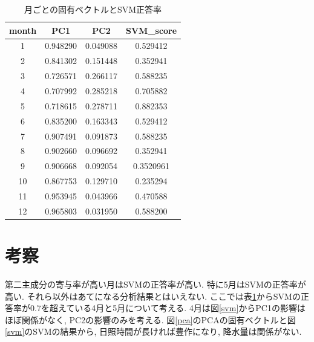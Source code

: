 \documentclass{jarticle}
\begin{document}
\begin{table}[H]
\caption{月ごとの固有ベクトルとSVM正答率}
\begin{tabular}{|c|c|c|c|} \hline
month&PC1&PC2 &SVM\_score\\ \hline
 1&0.948290&0.049088&0.529412\\ \hline
 2&0.841302&0.151448&0.352941\\ \hline
 3&0.726571&0.266117&0.588235\\ \hline
 4&0.707992 &0.285218&0.705882\\ \hline
 5&0.718615&0.278711&0.882353\\ \hline
 6&0.835200&0.163343&0.529412\\ \hline
 7&0.907491&0.091873&0.588235\\ \hline
 8&0.902660&0.096692&0.352941\\ \hline
 9&0.906668&0.092054&0.3520961\\ \hline
 10&0.867753&0.129710&0.235294\\ \hline
 11&0.953945&0.043966&0.470588\\ \hline
 12&0.965803&0.031950&0.588200\\ \hline
\end{tabular}
\centering
\label{score}
\end{table}


\hypertarget{header-n2056}{%
\section{考察}\label{header-n2056}}

第二主成分の寄与率が高い月はSVMの正答率が高い. 特に5月はSVMの正答率が高い. それら以外はあてになる分析結果とはいえない. ここでは表\ref{score}からSVMの正答率が$0.7$を超えている4月と5月について考える. 
4月は図\ref{svm}からPC1の影響はほぼ関係がなく, PC2の影響のみを考える. 図\ref{pca}のPCAの固有ベクトルと図\ref{svm}のSVMの結果から, 日照時間が長ければ豊作になり, 降水量は関係がない.
\end{document}
